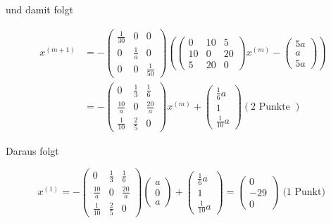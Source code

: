 \documentclass[10pt]{article}
\begin{document}
und damit folgt

$$
\begin{aligned}
x^{(m+1)} & =-\left(\begin{array}{ccc}
\frac{1}{30} & 0 & 0 \\
0 & \frac{1}{a} & 0 \\
0 & 0 & \frac{1}{50}
\end{array}\right)\left(\left(\begin{array}{ccc}
0 & 10 & 5 \\
10 & 0 & 20 \\
5 & 20 & 0
\end{array}\right) x^{(m)}-\left(\begin{array}{c}
5 a \\
a \\
5 a
\end{array}\right)\right) \\
& =-\left(\begin{array}{ccc}
0 & \frac{1}{3} & \frac{1}{6} \\
\frac{10}{a} & 0 & \frac{20}{a} \\
\frac{1}{10} & \frac{2}{5} & 0
\end{array}\right) x^{(m)}+\left(\begin{array}{c}
\frac{1}{6} a \\
1 \\
\frac{1}{10} a
\end{array}\right)(2 \text { Punkte })
\end{aligned}
$$

Daraus folgt

$$
x^{(1)}=-\left(\begin{array}{ccc}
0 & \frac{1}{3} & \frac{1}{6} \\
\frac{10}{a} & 0 & \frac{20}{a} \\
\frac{1}{10} & \frac{2}{5} & 0
\end{array}\right)\left(\begin{array}{c}
a \\
0 \\
a
\end{array}\right)+\left(\begin{array}{c}
\frac{1}{6} a \\
1 \\
\frac{1}{10} a
\end{array}\right)=\left(\begin{array}{c}
0 \\
-29 \\
0
\end{array}\right) \text { (1 Punkt) }
$$
\end{document}
